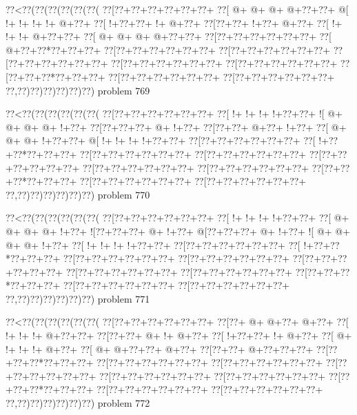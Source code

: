 \vbox{\vbox{\goo
\0??<\0??(\0??(\0??(\0??(\0??(\0??(
\0??[\0??+\0??+\0??+\0??+\0??+\0??+
\0??[\- @+\- @+\- @+\- @+\0??+\0??+
\- @[\- !+\- !+\- !+\- !+\- @+\0??+
\0??[\- !+\0??+\0??+\- !+\- @+\0??+
\0??[\0??+\0??+\- !+\0??+\- @+\0??+
\0??[\- !+\- !+\- !+\- @+\0??+\0??+
\0??[\- @+\- @+\- @+\- @+\0??+\0??+
\0??[\0??+\0??+\0??+\0??+\0??+\0??+
\0??[\- @+\0??+\0??*\0??+\0??+\0??+
\0??[\0??+\0??+\0??+\0??+\0??+\0??+
\0??[\0??+\0??+\0??+\0??+\0??+\0??+
\0??[\0??+\0??+\0??+\0??+\0??+\0??+
\0??[\0??+\0??+\0??+\0??+\0??+\0??+
\0??[\0??+\0??+\0??+\0??+\0??+\0??+
\0??[\0??+\0??+\0??*\0??+\0??+\0??+
\0??[\0??+\0??+\0??+\0??+\0??+\0??+
\0??[\0??+\0??+\0??+\0??+\0??+\0??+
\0??,\0??)\0??)\0??)\0??)\0??)\0??)
}
\hfil problem 769\hfil\break
}

\vbox{\vbox{\goo
\0??<\0??(\0??(\0??(\0??(\0??(\0??(
\0??[\0??+\0??+\0??+\0??+\0??+\0??+
\0??[\- !+\- !+\- !+\- !+\0??+\0??+
\- ![\- @+\- @+\- @+\- @+\- !+\0??+
\0??[\0??+\0??+\0??+\- @+\- !+\0??+
\0??[\0??+\0??+\- @+\0??+\- !+\0??+
\0??[\- @+\- @+\- @+\- !+\0??+\0??+
\- @[\- !+\- !+\- !+\- !+\0??+\0??+
\0??[\0??+\0??+\0??+\0??+\0??+\0??+
\0??[\- !+\0??+\0??*\0??+\0??+\0??+
\0??[\0??+\0??+\0??+\0??+\0??+\0??+
\0??[\0??+\0??+\0??+\0??+\0??+\0??+
\0??[\0??+\0??+\0??+\0??+\0??+\0??+
\0??[\0??+\0??+\0??+\0??+\0??+\0??+
\0??[\0??+\0??+\0??+\0??+\0??+\0??+
\0??[\0??+\0??+\0??*\0??+\0??+\0??+
\0??[\0??+\0??+\0??+\0??+\0??+\0??+
\0??[\0??+\0??+\0??+\0??+\0??+\0??+
\0??,\0??)\0??)\0??)\0??)\0??)\0??)
}
\hfil problem 770\hfil\break
}

\vbox{\vbox{\goo
\0??<\0??(\0??(\0??(\0??(\0??(\0??(
\0??[\0??+\0??+\0??+\0??+\0??+\0??+
\0??[\- !+\- !+\- !+\- !+\0??+\0??+
\0??[\- @+\- @+\- @+\- @+\- !+\0??+
\- ![\0??+\0??+\0??+\- @+\- !+\0??+
\- @[\0??+\0??+\0??+\- @+\- !+\0??+
\- ![\- @+\- @+\- @+\- @+\- !+\0??+
\0??[\- !+\- !+\- !+\- !+\0??+\0??+
\0??[\0??+\0??+\0??+\0??+\0??+\0??+
\0??[\- !+\0??+\0??*\0??+\0??+\0??+
\0??[\0??+\0??+\0??+\0??+\0??+\0??+
\0??[\0??+\0??+\0??+\0??+\0??+\0??+
\0??[\0??+\0??+\0??+\0??+\0??+\0??+
\0??[\0??+\0??+\0??+\0??+\0??+\0??+
\0??[\0??+\0??+\0??+\0??+\0??+\0??+
\0??[\0??+\0??+\0??*\0??+\0??+\0??+
\0??[\0??+\0??+\0??+\0??+\0??+\0??+
\0??[\0??+\0??+\0??+\0??+\0??+\0??+
\0??,\0??)\0??)\0??)\0??)\0??)\0??)
}
\hfil problem 771\hfil\break
}

\vbox{\vbox{\goo
\0??<\0??(\0??(\0??(\0??(\0??(\0??(
\0??[\0??+\0??+\0??+\0??+\0??+\0??+
\0??[\0??+\- @+\- @+\0??+\- @+\0??+
\0??[\- !+\- !+\- !+\- @+\0??+\0??+
\0??[\0??+\0??+\- @+\- !+\- @+\0??+
\0??[\- !+\0??+\0??+\- !+\- @+\0??+
\0??[\- @+\- !+\- !+\- !+\- @+\0??+
\0??[\- @+\- @+\0??+\0??+\- @+\0??+
\0??[\0??+\0??+\- @+\0??+\0??+\0??+
\0??[\0??+\0??+\0??*\0??+\0??+\0??+
\0??[\0??+\0??+\0??+\0??+\0??+\0??+
\0??[\0??+\0??+\0??+\0??+\0??+\0??+
\0??[\0??+\0??+\0??+\0??+\0??+\0??+
\0??[\0??+\0??+\0??+\0??+\0??+\0??+
\0??[\0??+\0??+\0??+\0??+\0??+\0??+
\0??[\0??+\0??+\0??*\0??+\0??+\0??+
\0??[\0??+\0??+\0??+\0??+\0??+\0??+
\0??[\0??+\0??+\0??+\0??+\0??+\0??+
\0??,\0??)\0??)\0??)\0??)\0??)\0??)
}
\hfil problem 772\hfil\break
}

